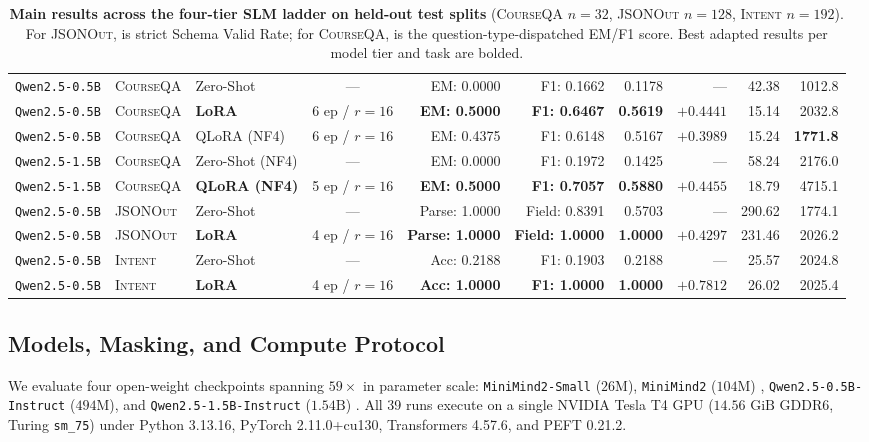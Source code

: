 \documentclass[10pt,a4paper,twocolumn]{article}
\begin{document}
\begin{table}[t]
{\begin{tabular}{lllcrrrrrr}
\texttt{Qwen2.5-0.5B} & \textsc{CourseQA} & Zero-Shot & --- & EM: 0.0000 & F1: 0.1662 & 0.1178 & --- & 42.38 & 1012.8 \\
\texttt{Qwen2.5-0.5B} & \textsc{CourseQA} & \textbf{LoRA} & 6 ep / $r=16$ & \textbf{EM: 0.5000} & \textbf{F1: 0.6467} & \textbf{0.5619} & $\mathbf{+0.4441}$ & 15.14 & 2032.8 \\
\texttt{Qwen2.5-0.5B} & \textsc{CourseQA} & QLoRA (NF4) & 6 ep / $r=16$ & EM: 0.4375 & F1: 0.6148 & 0.5167 & $+0.3989$ & 15.24 & \textbf{1771.8} \\
\texttt{Qwen2.5-1.5B} & \textsc{CourseQA} & Zero-Shot (NF4) & --- & EM: 0.0000 & F1: 0.1972 & 0.1425 & --- & 58.24 & 2176.0 \\
\texttt{Qwen2.5-1.5B} & \textsc{CourseQA} & \textbf{QLoRA (NF4)} & 5 ep / $r=16$ & \textbf{EM: 0.5000} & \textbf{F1: 0.7057} & \textbf{0.5880} & $\mathbf{+0.4455}$ & 18.79 & 4715.1 \\
\texttt{Qwen2.5-0.5B} & \textsc{JSONOut} & Zero-Shot & --- & Parse: 1.0000 & Field: 0.8391 & 0.5703 & --- & 290.62 & 1774.1 \\
\texttt{Qwen2.5-0.5B} & \textsc{JSONOut} & \textbf{LoRA} & 4 ep / $r=16$ & \textbf{Parse: 1.0000} & \textbf{Field: 1.0000} & \textbf{1.0000} & $\mathbf{+0.4297}$ & 231.46 & 2026.2 \\
\texttt{Qwen2.5-0.5B} & \textsc{Intent} & Zero-Shot & --- & Acc: 0.2188 & F1: 0.1903 & 0.2188 & --- & 25.57 & 2024.8 \\
\texttt{Qwen2.5-0.5B} & \textsc{Intent} & \textbf{LoRA} & 4 ep / $r=16$ & \textbf{Acc: 1.0000} & \textbf{F1: 1.0000} & \textbf{1.0000} & $\mathbf{+0.7812}$ & 26.02 & 2025.4 \\
\bottomrule
\end{tabular}%
}
\caption{\textbf{Main results across the four-tier SLM ladder on held-out test splits} (\textsc{CourseQA} $n=32$, \textsc{JSONOut} $n=128$, \textsc{Intent} $n=192$). For \textsc{JSONOut},  is strict Schema Valid Rate; for \textsc{CourseQA},  is the question-type-dispatched EM/F1 score. Best adapted results per model tier and task are bolded.}
\label{tab:main_results}
\end{table}

\subsection{Models, Masking, and Compute Protocol}

We evaluate four open-weight checkpoints spanning $59\times$ in parameter scale: \texttt{MiniMind2-Small} ($26\text{M}$), \texttt{MiniMind2} ($104\text{M}$) \citep{gong2025minimind}, \texttt{Qwen2.5-0.5B-Instruct} ($494\text{M}$), and \texttt{Qwen2.5-1.5B-Instruct} ($1.54\text{B}$) \citep{yang2024qwen25}. All 39 runs execute on a single NVIDIA Tesla T4 GPU ($14.56\text{ GiB}$ GDDR6, Turing \texttt{sm\_75}) under Python 3.13.16, PyTorch 2.11.0+cu130, Transformers 4.57.6, and PEFT 0.21.2.
\end{document}
